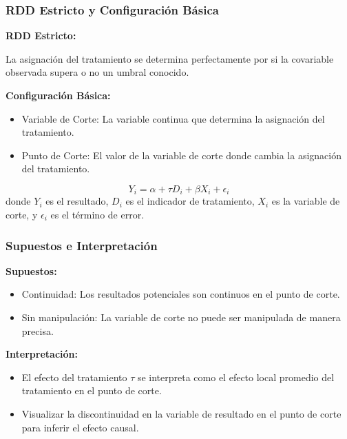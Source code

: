 \documentclass[notes,10pt,aspectratio=169]{beamer}
\begin{document}
\begin{frame}
  \frametitle{RDD Estricto y Configuración Básica}

  \textbf{RDD Estricto:} 
  
  La asignación del tratamiento se determina perfectamente por si la covariable observada supera o no un umbral conocido.

  \vspace{1em}
  \textbf{Configuración Básica:}
  \begin{itemize}
    \item Variable de Corte: La variable continua que determina la asignación del tratamiento.
    \item Punto de Corte: El valor de la variable de corte donde cambia la asignación del tratamiento.
  \end{itemize}
  \begin{equation}
    Y_i = \alpha + \tau D_i + \beta X_i + \epsilon_i
  \end{equation}
  donde $Y_i$ es el resultado, $D_i$ es el indicador de tratamiento, $X_i$ es la variable de corte, y $\epsilon_i$ es el término de error.
\end{frame}

\begin{frame}
  \frametitle{Supuestos e Interpretación}

  \textbf{Supuestos:}
  \begin{itemize}
    \item Continuidad: Los resultados potenciales son continuos en el punto de corte.
    \item Sin manipulación: La variable de corte no puede ser manipulada de manera precisa.
  \end{itemize}

  \vspace{1em}
  \textbf{Interpretación:}
  \begin{itemize}
    \item El efecto del tratamiento $\tau$ se interpreta como el efecto local promedio del tratamiento en el punto de corte.
    \item Visualizar la discontinuidad en la variable de resultado en el punto de corte para inferir el efecto causal.
  \end{itemize}
\end{frame}
\end{document}
